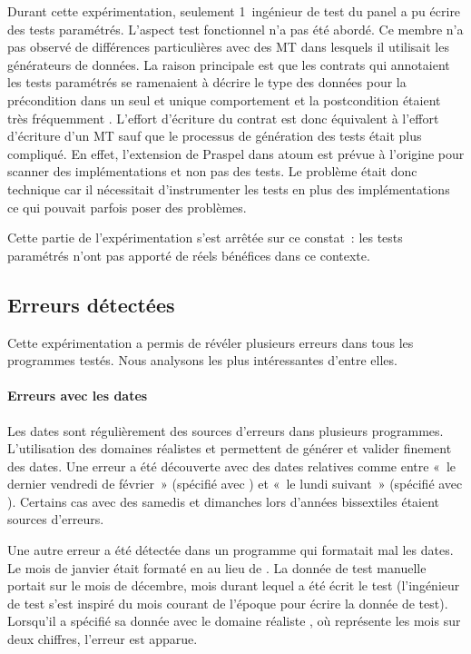 Durant cette expérimentation, seulement 1~ingénieur de test du panel a pu écrire
des tests paramétrés. L'aspect test fonctionnel n'a pas été abordé. Ce membre
n'a pas observé de différences particulières avec des MT dans lesquels il
utilisait les générateurs de données. La raison principale est que les contrats
qui annotaient les tests paramétrés se ramenaient à décrire le type des données
pour la précondition dans un seul et unique comportement et la postcondition
étaient très fréquemment . L'effort d'écriture du contrat
est donc équivalent à l'effort d'écriture d'un MT sauf que le processus de
génération des tests était plus compliqué. En effet, l'extension de Praspel dans
atoum est prévue à l'origine pour scanner des implémentations et non pas des
tests. Le problème était donc technique car il nécessitait d'instrumenter les
tests en plus des implémentations ce qui pouvait parfois poser des problèmes.

Cette partie de l'expérimentation s'est arrêtée sur ce constat~: les tests
paramétrés n'ont pas apporté de réels bénéfices dans ce contexte.

\subsection{Erreurs détectées}
\label{subsection:experimentation:errors}

Cette expérimentation a permis de révéler plusieurs erreurs dans tous les
programmes testés. Nous analysons les plus intéressantes d'entre elles.

\paragraph{Erreurs avec les dates} Les dates sont régulièrement des sources
d'erreurs dans plusieurs programmes. L'utilisation des domaines réalistes
 et  permettent de générer et valider finement des
dates. Une erreur a été découverte avec des dates relatives comme entre «~le
dernier vendredi de février~» (spécifié avec ) et «~le lundi suivant~» (spécifié avec ). Certains cas avec des samedis et dimanches lors d'années
bissextiles étaient sources d'erreurs.

Une autre erreur a été détectée dans un programme qui formatait mal les dates.
Le mois de janvier était formaté en  au lieu de . La donnée de
test manuelle portait sur le mois de décembre, mois durant lequel a été écrit le
test (l'ingénieur de test s'est inspiré du mois courant de l'époque pour écrire
la donnée de test). Lorsqu'il a spécifié sa donnée avec le domaine réaliste
, où  représente les mois sur deux chiffres, l'erreur
est apparue.

